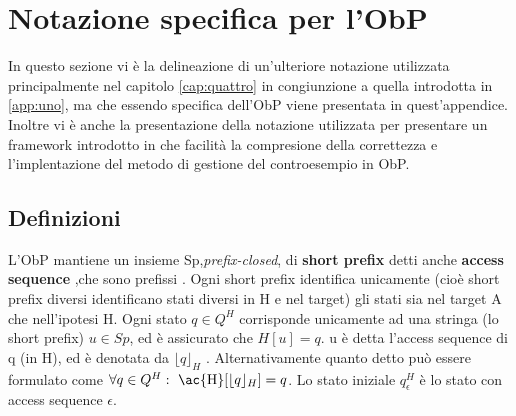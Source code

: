 \section{Notazione specifica per l'ObP}
In questo sezione vi è la delineazione di un'ulteriore notazione utilizzata principalmente nel capitolo \ref{cap:quattro} in congiunzione a quella introdotta in \ref{app:uno}, ma che essendo specifica dell'\ac{ObP} viene presentata in quest'appendice. Inoltre vi è anche la presentazione della notazione utilizzata per presentare un framework introdotto in \cite{StefCounterexample14} che facilità la compresione della correttezza e l'implentazione del metodo di gestione del controesempio in \ac{ObP}.
\subsection{Definizioni}
L'\ac{ObP} mantiene un insieme Sp,\textit{prefix-closed}, di \textbf{short prefix} detti anche \textbf{access sequence} ,che sono prefissi . Ogni short prefix identifica unicamente (cioè short prefix diversi identificano stati diversi in \ac{H} e nel target)  gli stati sia nel target A che nell'ipotesi \ac{H}. Ogni stato $q \in Q^{H}$ corrisponde unicamente ad una stringa (lo short prefix) $u \in Sp$, ed è assicurato che $H[u] = q$.  u è detta l'access sequence di q (in \ac{H}), ed è denotata da $\lfloor q \rfloor_{H}$ . Alternativamente quanto detto può essere formulato come $\forall q \in Q^{H} : \text{ \ac{H}}[\lfloor q \rfloor_{H}]=q$. Lo stato iniziale $q_{\epsilon}^{H}$ è lo stato con access sequence $\epsilon$.


